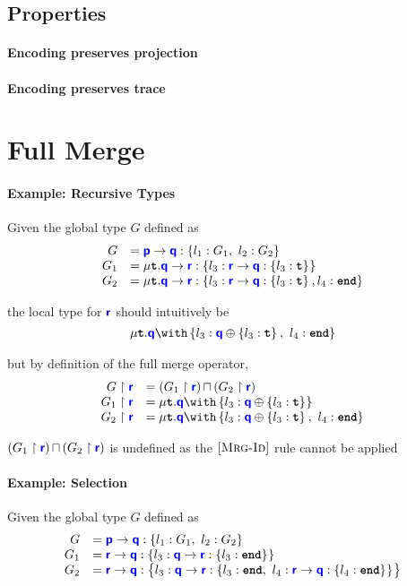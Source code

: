 \documentclass{article}
\begin{document}
\subsection{Properties}

\paragraph{Encoding preserves projection}

\paragraph{Encoding preserves trace}

\clearpage

\section{Full Merge}

\paragraph{Example: Recursive Types}
Given the global type $G$ defined as
\[
\begin{array}{rl}
G &= \gcomm{p}{q}{l_1: G_1,~l_2: G_2}{} \\
G_1 &= \tyrec{\gcomm{q}{r}{l_3: \gcomm{r}{q}{l_3: \tyrecvar}{}}{}} \\
G_2 &= \tyrec{\gcomm{q}{r}{l_3: \gcomm{r}{q}{l_3: \tyrecvar}{}, l_4: \tyend}{}}
\end{array}
\]

the local type for $\role{r}$ should intuitively be
\[
\tyrec{
\tybra{q}{l_3: \tysel{q}{l_3: \tyrecvar}{},~l_4: \tyend}{}
}
\]

but by definition of the full merge operator,
\[
\begin{array}{rl}
\proj{G}{r} &= \tymerge{\left(\proj{G_1}{r}\right)}{\left(\proj{G_2}{r}\right)} \\
\proj{G_1}{r} &= \tyrec{\tybra{q}{l_3: \tysel{q}{l_3: \tyrecvar}{}}{}} \\
\proj{G_2}{r} &= \tyrec{\tybra{q}{l_3: \tysel{q}{l_3: \tyrecvar}{},~l_4: \tyend}{}}
\end{array}
\]

$\tymerge{\left(\proj{G_1}{r}\right)}{\left(\proj{G_2}{r}\right)}$ is undefined as the $\rulename{Mrg-Id}$ rule
cannot be applied

\paragraph{Example: Selection}
Given the global type $G$ defined as
\[
\begin{array}{rl}
G &= \gcomm{p}{q}{l_1: G_1,~l_2: G_2}{} \\
G_1 &= \gcomm{r}{q}{l_3: \gcomm{q}{r}{l_3: \tyend}{}}{} \\
G_2 &= \gcomm{r}{q}{l_3: \gcomm{q}{r}{l_3: \tyend,~l_4: \gcomm{r}{q}{l_4: \tyend}{}}{}}{}
\end{array}
\]
\end{document}
